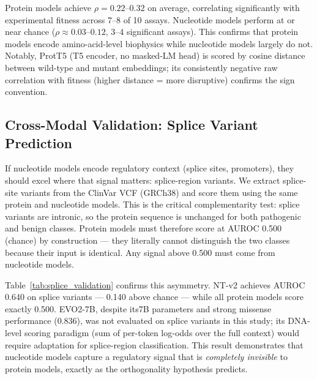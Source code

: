\documentclass[9pt]{article}
\begin{document}
Protein models achieve $\rho = 0.22$--$0.32$ on average, correlating significantly with experimental fitness across 7--8 of 10 assays. Nucleotide models perform at or near chance ($\rho \approx 0.03$--$0.12$, 3--4 significant assays). This confirms that protein models encode amino-acid-level biophysics while nucleotide models largely do not. Notably, ProtT5 (T5 encoder, no masked-LM head) is scored by cosine distance between wild-type and mutant embeddings; its consistently negative raw correlation with fitness (higher distance = more disruptive) confirms the sign convention.

\subsection{Cross-Modal Validation: Splice Variant Prediction}

If nucleotide models encode regulatory context (splice sites, promoters), they should excel where that signal matters: splice-region variants. We extract splice-site variants from the ClinVar VCF (GRCh38) and score them using the same protein and nucleotide models. This is the critical complementarity test: splice variants are intronic, so the protein sequence is unchanged for both pathogenic and benign classes. Protein models must therefore score at AUROC 0.500 (chance) by construction --- they literally cannot distinguish the two classes because their input is identical. Any signal above 0.500 must come from nucleotide models.

Table~\ref{tab:splice_validation} confirms this asymmetry. NT-v2 achieves AUROC 0.640 on splice variants --- 0.140 above chance --- while all protein models score exactly 0.500. EVO2-7B, despite its7B parameters and strong missense performance (0.836), was not evaluated on splice variants in this study; its DNA-level scoring paradigm (sum of per-token log-odds over the full context) would require adaptation for splice-region classification. This result demonstrates that nucleotide models capture a regulatory signal that is \textit{completely invisible} to protein models, exactly as the orthogonality hypothesis predicts.
\end{document}
